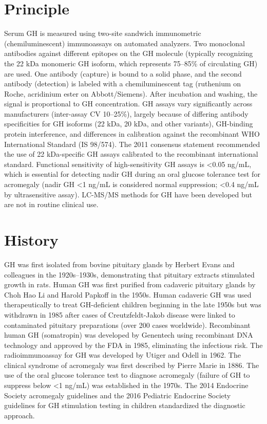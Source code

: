 \section*{Principle}
Serum GH is measured using two-site sandwich immunometric (chemiluminescent) immunoassays on automated analyzers. Two monoclonal antibodies against different epitopes on the GH molecule (typically recognizing the 22 kDa monomeric GH isoform, which represents 75--85\% of circulating GH) are used. One antibody (capture) is bound to a solid phase, and the second antibody (detection) is labeled with a chemiluminescent tag (ruthenium on Roche, acridinium ester on Abbott/Siemens). After incubation and washing, the signal is proportional to GH concentration. GH assays vary significantly across manufacturers (inter-assay CV 10--25\%), largely because of differing antibody specificities for GH isoforms (22 kDa, 20 kDa, and other variants), GH-binding protein interference, and differences in calibration against the recombinant WHO International Standard (IS 98/574). The 2011 consensus statement recommended the use of 22 kDa-specific GH assays calibrated to the recombinant international standard. Functional sensitivity of high-sensitivity GH assays is <0.05 ng/mL, which is essential for detecting nadir GH during an oral glucose tolerance test for acromegaly (nadir GH <1 ng/mL is considered normal suppression; <0.4 ng/mL by ultrasensitive assay). LC-MS/MS methods for GH have been developed but are not in routine clinical use.

\section*{History}
GH was first isolated from bovine pituitary glands by Herbert Evans and colleagues in the 1920s--1930s, demonstrating that pituitary extracts stimulated growth in rats. Human GH was first purified from cadaveric pituitary glands by Choh Hao Li and Harold Papkoff in the 1950s. Human cadaveric GH was used therapeutically to treat GH-deficient children beginning in the late 1950s but was withdrawn in 1985 after cases of Creutzfeldt-Jakob disease were linked to contaminated pituitary preparations (over 200 cases worldwide). Recombinant human GH (somatropin) was developed by Genentech using recombinant DNA technology and approved by the FDA in 1985, eliminating the infectious risk. The radioimmunoassay for GH was developed by Utiger and Odell in 1962. The clinical syndrome of acromegaly was first described by Pierre Marie in 1886. The use of the oral glucose tolerance test to diagnose acromegaly (failure of GH to suppress below <1 ng/mL) was established in the 1970s. The 2014 Endocrine Society acromegaly guidelines and the 2016 Pediatric Endocrine Society guidelines for GH stimulation testing in children standardized the diagnostic approach.

